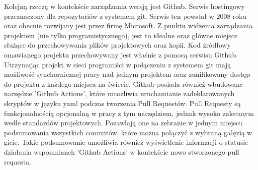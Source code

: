 Kolejną rzeczą w kontekście zarządzania wersją jest Github. Serwis hostingowy przeznaczony dla repozytoriów z systemem git. Serwis ten powstał w 2008 roku oraz obecnie rozwijany jest przez firmę Microsoft. \cite{GithubWiki} Z punktu widzenia zarządzania projektem (nie tylko programistycznego), jest to idealne oraz główne miejsce służące do przechowywania plików projektowych oraz kopii. Kod źródłowy omawianego projektu przechowywany jest właśnie z pomocą serwisu Github. Utrzymując projekt w sieci programiści w połączeniu z systemem git mają możliwość synchornicznej pracy nad jednym projektem oraz zunifikowany dostęp do projektu z każdego miejsca na świecie. Github posiada również wbudowane narzędzie 'Github Actions', które umożliwia uruchamianie zadeklarowanych skryptów w języku yaml podczas tworzenia Pull Requestów. Pull Requesty są funkcjonalnością opcjonalną w pracy z tym narzędziem, jednak wysoko zalecanym wedle standardów projektowych. Pozawlają one na zebranie w jednym miejscu podsumowania wszystkich commitów, które można połączyć z wybraną gałęzią w gicie. Takie podsumowanie umożliwia również wyświetlenie informacji o statusie działania wspomnianch 'Github Actions' w kontekście nowo stworzonego pull requesta.